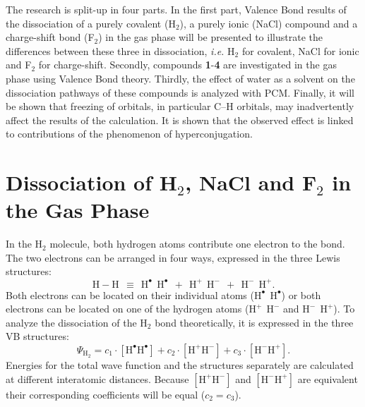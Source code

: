 The research is split-up in four parts.  In the first part, Valence Bond results of the dissociation of a purely covalent (H$_2$), a purely ionic (NaCl) compound and a charge-shift bond (F$_2$) in the gas phase will be presented to illustrate the differences between these three in dissociation, \textit{i.e.} H$_2$ for covalent, NaCl for ionic and F$_2$ for charge-shift. Secondly, compounds \textbf{1}-\textbf{4} are investigated in the gas phase using Valence Bond theory. Thirdly, the effect of water as a solvent on the dissociation pathways of these compounds is analyzed with PCM. Finally, it will be shown that freezing of orbitals, in particular C--H orbitals, may inadvertently affect the results of the calculation. It is shown that the observed effect is linked to contributions of the phenomenon of hyperconjugation.

\section{Dissociation of H$_2$, NaCl and F$_2$ in the Gas Phase}

In the H$_2$ molecule, both hydrogen atoms contribute one electron to the bond. The two electrons can be arranged in four ways, expressed in the three Lewis structures:
\begin{equation}
\nonumber
\mathrm{H-H\ \ \equiv \ \ H^{\bullet}\ \ H^{\bullet}\ \ +\ \ H^{+}\ \ H^{-}\ \ +\ \ H^{-}\ \ H^{+}}.
\end{equation}
Both electrons can be located on their individual atoms ($\mathrm{H^{\bullet}\ \ H^{\bullet}}$) or both electrons can be located on one of the hydrogen atoms ($\mathrm{H^{+}\ \ H^{-}}$ and $\mathrm{H^{-}\ \ H^{+}}$). To analyze the dissociation of the H$_2$ bond theoretically, it is expressed in the three VB structures:
\begin{equation}
\nonumber
\Psi_{\mathrm{H_2}} = c_1\cdot [\mathrm{H}^\bullet \mathrm{H}^\bullet] + c_2 \cdot [\mathrm{H}^{+}\mathrm{H}^{-}] + c_3 \cdot [\mathrm{H}^{-}\mathrm{H}^{+}]. 
\end{equation}
Energies for the total wave function and the structures separately are calculated at different interatomic distances. Because $[\mathrm{H}^{+}\mathrm{H}^{-}]$ and $[\mathrm{H}^{-}\mathrm{H}^{+}]$ are equivalent their corresponding coefficients will be equal ($c_2 = c_3$).  

